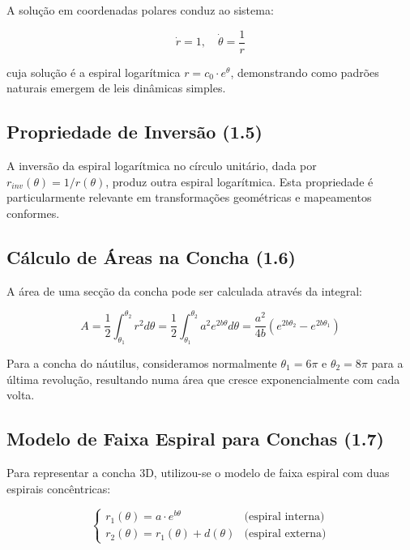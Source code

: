 \documentclass[12pt,a4paper,oneside]{extarticle}
\begin{document}
A solução em coordenadas polares conduz ao sistema:

\begin{equation}
\dot{r} = 1, \quad \dot{\theta} = \frac{1}{r}
\end{equation}

cuja solução é a espiral logarítmica $r = c_0 \cdot e^\theta$, demonstrando como padrões naturais emergem de leis dinâmicas simples.

\subsection{Propriedade de Inversão (1.5)}
A inversão da espiral logarítmica no círculo unitário, dada por $r_{inv}(\theta) = 1/r(\theta)$, produz outra espiral logarítmica. Esta propriedade é particularmente relevante em transformações geométricas e mapeamentos conformes.

\subsection{Cálculo de Áreas na Concha (1.6)}
A área de uma secção da concha pode ser calculada através da integral:

\begin{equation}
A = \frac{1}{2}\int_{\theta_1}^{\theta_2} r^2 d\theta = \frac{1}{2}\int_{\theta_1}^{\theta_2} a^2 e^{2b\theta} d\theta = \frac{a^2}{4b}(e^{2b\theta_2} - e^{2b\theta_1})
\label{eq:area}
\end{equation}

Para a concha do náutilus, consideramos normalmente $\theta_1 = 6\pi$ e $\theta_2 = 8\pi$ para a última revolução, resultando numa área que cresce exponencialmente com cada volta.

\subsection{Modelo de Faixa Espiral para Conchas (1.7)}
Para representar a concha 3D, utilizou-se o modelo de faixa espiral com duas espirais concêntricas:

\begin{equation}
\begin{cases}
r_1(\theta) = a \cdot e^{b\theta} & \text{(espiral interna)} \\
r_2(\theta) = r_1(\theta) + d(\theta) & \text{(espiral externa)}
\end{cases}
\label{eq:faixa}
\end{equation}
\end{document}
